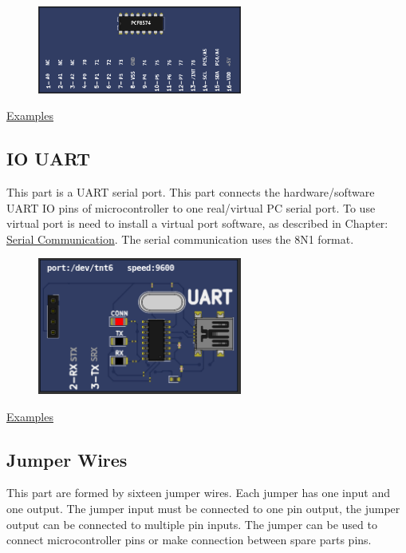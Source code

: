 \begin{figure}[H]
\center
\includegraphics[width=0.6\textwidth]{img/part_pcf8574.png} 
\end{figure} 

\href{https://lcgamboa.github.io/picsimlab_examples/parts_IO_PCF8574.html}{Examples}


\subsection{IO UART}

This part is a UART serial port. This part connects the hardware/software UART IO pins of microcontroller to
one real/virtual PC serial port. To use virtual port is need to install a virtual port software, as 
described in Chapter: \hyperlink{def:seriali}{Serial Communication}. 
The serial communication uses the 8N1 format.

\begin{figure}[H]
\center
\includegraphics[width=0.6\textwidth]{img/part_uart.png} 
\end{figure} 

\href{https://lcgamboa.github.io/picsimlab_examples/parts_IO_UART.html}{Examples}


\subsection{Jumper Wires}

This part are formed by sixteen jumper wires. Each jumper has one input and one output.  The jumper input must be connected to one pin output, 
the jumper output can be connected to multiple pin inputs. The jumper can be used to connect microcontroller pins or make connection between 
spare parts pins.   

